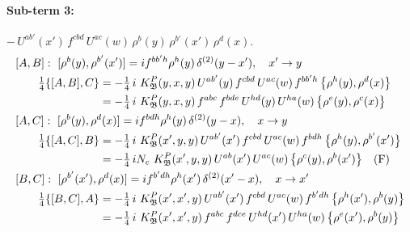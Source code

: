 \documentclass[10pt]{article}
\numberwithin{equation}{section}
\begin{document}
\paragraph{Sub-term 3:} $-\,U^{ab'}(x')\,f^{cbd}\,U^{ac}(w)\,\rho^{b}(y)\,\rho^{b'}(x')\,\rho^{d}(x)$.
\begin{align}
&[A,B]:\ [\rho^{b}(y),\rho^{b'}(x')]=i f^{bb'h}\rho^{h}(y)\,\delta^{(2)}(y-x'),\quad x'\to y\notag\\
&\qquad \tfrac14\{[A,B],C\}=-\tfrac14\,i\,\,K^{P}_{\mathfrak B}(y,x,y)\,U^{ab'}(y)\,f^{cbd}\,U^{ac}(w)\,f^{bb'h}\,\big\{\rho^{h}(y),\rho^{d}(x)\big\}\notag\\
&\qquad\phantom{\tfrac14\{[A,B],C\}}=-\tfrac14\,i\,\,K^{P}_{\mathfrak B}(y,x,y)\,f^{abc}\,f^{bde}\,U^{hd}(y)\,U^{ha}(w)\,\big\{\rho^{e}(y),\rho^{c}(x)\big\}
\label{B:eq:GIII.II.P-3-AB}\\
&[A,C]:\ [\rho^{b}(y),\rho^{d}(x)]=i f^{bdh}\rho^{h}(y)\,\delta^{(2)}(y-x),\quad x\to y\notag\\
&\qquad \tfrac14\{[A,C],B\}=-\tfrac14\,i\,\,K^{P}_{\mathfrak B}(x',y,y)\,U^{ab'}(x')\,f^{cbd}\,U^{ac}(w)\,f^{bdh}\,\big\{\rho^{h}(y),\rho^{b'}(x')\big\}\notag\\
&\qquad\phantom{\tfrac14\{[A,C],B\}}=-\tfrac14\,i N_{c}\,\,K^{P}_{\mathfrak B}(x',y,y)\,U^{ab}(x')\,U^{ac}(w)\,\big\{\rho^{c}(y),\rho^{b}(x')\big\}\quad\text{(F)}
\label{B:eq:GIII.II.P-3-AC}\\
&[B,C]:\ [\rho^{b'}(x'),\rho^{d}(x)]=i f^{b'dh}\rho^{h}(x')\,\delta^{(2)}(x'-x),\quad x\to x'\notag\\
&\qquad \tfrac14\{[B,C],A\}=-\tfrac14\,i\,\,K^{P}_{\mathfrak B}(x',x',y)\,U^{ab'}(x')\,f^{cbd}\,U^{ac}(w)\,f^{b'dh}\,\big\{\rho^{h}(x'),\rho^{b}(y)\big\}\notag\\
&\qquad\phantom{\tfrac14\{[B,C],A\}}=-\tfrac14\,i\,\,K^{P}_{\mathfrak B}(x',x',y)\,f^{abc}\,f^{dce}\,U^{hd}(x')\,U^{ha}(w)\,\big\{\rho^{e}(x'),\rho^{b}(y)\big\}
\label{B:eq:GIII.II.P-3-BC}
\end{align}
\end{document}

